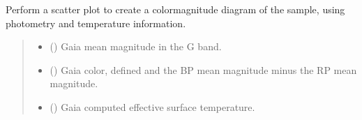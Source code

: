 \documentclass[letterpaper,10pt,english]{sphinxmanual}
\begin{document}
\begin{fulllineitems}
\label{\detokenize{plots:ggcas.plots.colorMagnitude}}
\pysigstartsignatures
{}
\pysigstopsignatures
\sphinxAtStartPar
Perform a scatter plot to create a color\sphinxhyphen{}magnitude diagram of the sample, using photometry and temperature information.
\begin{quote}\begin{description}
\begin{itemize}
\item {} 
\sphinxAtStartPar
{} (\sphinxstyleliteralemphasis{\sphinxupquote{ | }}) \textendash{} Gaia mean magnitude in the G band.

\item {} 
\sphinxAtStartPar
{} (\sphinxstyleliteralemphasis{\sphinxupquote{ | }}) \textendash{} Gaia color, defined and the BP mean magnitude minus the RP mean magnitude.

\item {} 
\sphinxAtStartPar
{} (\sphinxstyleliteralemphasis{\sphinxupquote{ | }}) \textendash{} Gaia computed effective surface temperature.

\end{itemize}

\end{description}\end{quote}

\end{fulllineitems}

\end{document}
